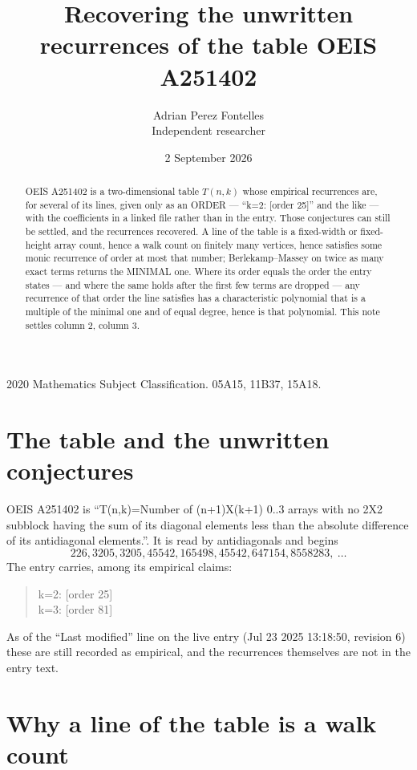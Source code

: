 \documentclass[11pt,a4paper]{article}
\title{Recovering the unwritten recurrences of the table OEIS A251402}
\author{Adrian Perez Fontelles\\ \small Independent researcher}
\date{2 September 2026}
\theoremstyle{plain}
\theoremstyle{definition}
\begin{document}
\maketitle

\begin{abstract}
OEIS A251402 is a two-dimensional table $T(n,k)$ whose empirical recurrences are, for several of
its lines, given only as an ORDER --- ``k=2: [order 25]'' and the like --- with the
coefficients in a linked file rather than in the entry. Those conjectures can still be settled,
and the recurrences recovered. A line of the table is a fixed-width or fixed-height array
count, hence a walk count on finitely many vertices, hence satisfies some monic recurrence of
order at most that number; Berlekamp--Massey on twice as many exact terms returns the MINIMAL
one. Where its order equals the order the entry states --- and where the same holds after the
first few terms are dropped --- any recurrence of that order the line satisfies has a
characteristic polynomial that is a multiple of the minimal one and of equal degree, hence is
that polynomial. This note settles column 2, column 3.
\end{abstract}

\noindent\small 2020 Mathematics Subject Classification. 05A15, 11B37, 15A18.\normalsize

\section{The table and the unwritten conjectures}

OEIS A251402 is ``T(n,k)=Number of (n+1)X(k+1) 0..3 arrays with no 2X2 subblock having the sum of its diagonal elements less than the absolute difference of its antidiagonal elements.''. It is read by antidiagonals and begins
\[
226, 3205, 3205, 45542, 165498, 45542, 647154, 8558283,\ \dots
\]
The entry carries, among its empirical claims:
\begin{quote}\small
k=2: [order 25]\\
k=3: [order 81]
\end{quote}
As of the ``Last modified'' line on the live entry (Jul 23 2025 13:18:50, revision 6) these are still
recorded as empirical, and the recurrences themselves are not in the entry text.

\section{Why a line of the table is a walk count}
\end{document}
